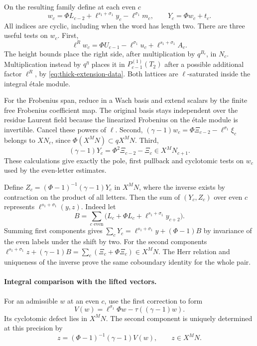 On the resulting family define at each even \(c\)
\[
 w_c=\Phi L_{c-2}+\ell^{s_1+\sigma_1}y_c-\ell^{\sigma_1}m_c,
 \qquad Y_c=\Phi w_c+t_c .
\]
All indices are cyclic, including when the word has length two.
There are three useful tests on \(w_c\). First,
\[
 \ell^R w_c=\Phi U_{c-1}-\ell^{\sigma_1}u_c
                        +\ell^{s_1+\sigma_1}A_c .
\]
The height bounds place the right side, after multiplication
by \(q^{B_c}\), in \(N_c\). Multiplication instead by \(q^\eta\)
places it in \(P_{c-1}^{(1)}(T_2)\) after a possible
additional factor \(\ell^R\), by \eqref{eq:thick-extension-data}.
Both lattices are \(\ell\)-saturated inside the integral
\'etale module.

For the Frobenius span, reduce in a Wach basis
and extend scalars by the finite free Frobenius coefficient map.
The original basis stays independent over the residue Laurent
field because the linearized Frobenius on the \'etale module
is invertible. Cancel these powers of \(\ell\).
Second, \((\gamma-1)w_c=\Phi\Xi_{c-2}-\ell^{\sigma_1}\xi_c\)
belongs to \(XN_c\), since
\(\Phi(X^MN)\subset q X^MN\). Third,
\[
                (\gamma-1)Y_c=\Phi^2\Xi_{c-2}-\Xi_c
                                 \in X^MN_{c+1}.
\]
These calculations give exactly the pole, first pullback
and cyclotomic tests on \(w_c\) used by the even-letter estimates.

Define \(Z_c=(\Phi-1)^{-1}(\gamma-1)Y_c\) in \(X^MN\),
where the inverse exists by contraction on the product of all
letters. Then the sum of \((Y_c,Z_c)\) over even \(c\)
represents \(\ell^{s_1+\sigma_1}(y,z)\). Indeed let
\[
  B=\sum_{c\text{ even}}\bigl(L_c+\Phi L_c
                                  +\ell^{s_1+\sigma_1}y_{c+2}\bigr).
\]
Summing first components gives
\(\sum_cY_c=\ell^{s_1+\sigma_1}y+(\Phi-1)B\)
by invariance of the even labels under the shift by two.
For the second components
\(\ell^{s_1+\sigma_1}z+(\gamma-1)B
 =\sum_c(\Xi_c+\Phi\Xi_c)\in X^MN\).
The Herr relation and uniqueness of the inverse prove the same
coboundary identity for the whole pair.
\label{cor:inert-thick-herr-1}

\paragraph{Integral comparison with the lifted vectors.}
For an admissible \(w\) at an even \(c\), use the first
correction to form
\[
             V(w)=\ell^{\sigma_1}\Phi w
                          -\tau((\gamma-1)w).
\]
Its cyclotomic defect lies in \(X^MN\). The second component is uniquely determined at this precision by
\[
 z=(\Phi-1)^{-1}(\gamma-1)V(w),\qquad z\in X^MN.
\]

